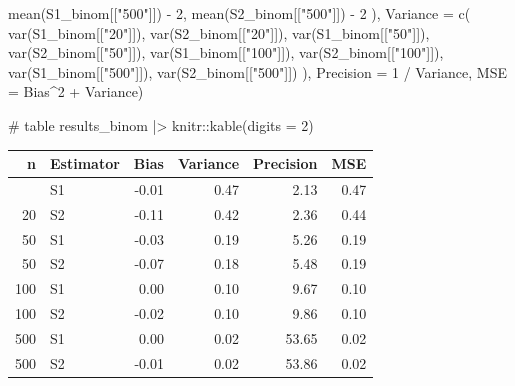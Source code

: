 \documentclass[
]{article}
\newenvironment{Shaded}{\begin{snugshade}}{\end{snugshade}}
\newcommand{\AttributeTok}[1]{\textcolor[rgb]{0.40,0.45,0.13}{#1}}
\newcommand{\CommentTok}[1]{\textcolor[rgb]{0.37,0.37,0.37}{#1}}
\newcommand{\DecValTok}[1]{\textcolor[rgb]{0.68,0.00,0.00}{#1}}
\newcommand{\FunctionTok}[1]{\textcolor[rgb]{0.28,0.35,0.67}{#1}}
\newcommand{\NormalTok}[1]{\textcolor[rgb]{0.00,0.23,0.31}{#1}}
\newcommand{\SpecialCharTok}[1]{\textcolor[rgb]{0.37,0.37,0.37}{#1}}
\newcommand{\StringTok}[1]{\textcolor[rgb]{0.13,0.47,0.30}{#1}}
\begin{document}
\begin{Shaded}
\begin{Highlighting}[numbers=left,,]
    \FunctionTok{mean}\NormalTok{(S1\_binom[[}\StringTok{"500"}\NormalTok{]]) }\SpecialCharTok{{-}} \DecValTok{2}\NormalTok{, }\FunctionTok{mean}\NormalTok{(S2\_binom[[}\StringTok{"500"}\NormalTok{]]) }\SpecialCharTok{{-}} \DecValTok{2}
\NormalTok{  ),}
  \AttributeTok{Variance =} \FunctionTok{c}\NormalTok{(}
    \FunctionTok{var}\NormalTok{(S1\_binom[[}\StringTok{"20"}\NormalTok{]]),  }\FunctionTok{var}\NormalTok{(S2\_binom[[}\StringTok{"20"}\NormalTok{]]),}
    \FunctionTok{var}\NormalTok{(S1\_binom[[}\StringTok{"50"}\NormalTok{]]),  }\FunctionTok{var}\NormalTok{(S2\_binom[[}\StringTok{"50"}\NormalTok{]]),}
    \FunctionTok{var}\NormalTok{(S1\_binom[[}\StringTok{"100"}\NormalTok{]]), }\FunctionTok{var}\NormalTok{(S2\_binom[[}\StringTok{"100"}\NormalTok{]]),}
    \FunctionTok{var}\NormalTok{(S1\_binom[[}\StringTok{"500"}\NormalTok{]]), }\FunctionTok{var}\NormalTok{(S2\_binom[[}\StringTok{"500"}\NormalTok{]])}
\NormalTok{  ),}
  \AttributeTok{Precision =} \DecValTok{1} \SpecialCharTok{/}\NormalTok{ Variance,}
  \AttributeTok{MSE =}\NormalTok{ Bias}\SpecialCharTok{\^{}}\DecValTok{2} \SpecialCharTok{+}\NormalTok{ Variance)}

\CommentTok{\# table}
\NormalTok{results\_binom }\SpecialCharTok{|\textgreater{}}\NormalTok{ knitr}\SpecialCharTok{::}\FunctionTok{kable}\NormalTok{(}\AttributeTok{digits =} \DecValTok{2}\NormalTok{)}
\end{Highlighting}
\end{Shaded}

\begin{longtable}[]{@{}rlrrrr@{}}
\toprule\noalign{}
n & Estimator & Bias & Variance & Precision & MSE \\
\midrule\noalign{}
\endhead
\bottomrule\noalign{}
\endlastfoot
20 & S1 & -0.01 & 0.47 & 2.13 & 0.47 \\
20 & S2 & -0.11 & 0.42 & 2.36 & 0.44 \\
50 & S1 & -0.03 & 0.19 & 5.26 & 0.19 \\
50 & S2 & -0.07 & 0.18 & 5.48 & 0.19 \\
100 & S1 & 0.00 & 0.10 & 9.67 & 0.10 \\
100 & S2 & -0.02 & 0.10 & 9.86 & 0.10 \\
500 & S1 & 0.00 & 0.02 & 53.65 & 0.02 \\
500 & S2 & -0.01 & 0.02 & 53.86 & 0.02 \\
\end{longtable}
\end{document}

